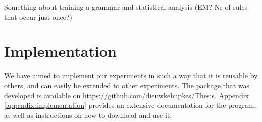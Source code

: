 Something about training a grammar and statistical analysis (EM? Nr of rules that occur just once?)


\section{Implementation}
\label{sec:implementation}

We have aimed to implement our experiments in such a way that it is reusable by others, and can easily be extended to other experiments. The package that was developed is available on  \href{https://github.com/dieuwkehupkes/Thesis}{https://github.com/dieuwkehupkes/Thesis}. Appendix \ref{appendix:implementation} provides an extensive documentation for the program, as well as instructions on how to download and use it.
%
%
%